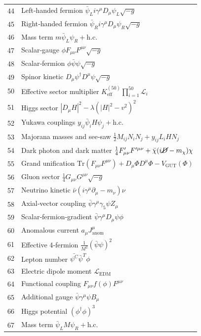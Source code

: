 \documentclass[12pt,a4paper]{article}
\begin{document}
\begin{longtable}{r l}
		44 & Left‑handed fermion \(\bar{\psi}_L i\gamma^\mu D_\mu\psi_L\sqrt{-g}\) \\
		45 & Right‑handed fermion \(\bar{\psi}_R i\gamma^\mu D_\mu\psi_R\sqrt{-g}\) \\
		46 & Mass term \(m\bar{\psi}_L\psi_R + \text{h.c.}\) \\
		47 & Scalar‑gauge \(\phi F_{\mu\nu}F^{\mu\nu}\sqrt{-g}\) \\
		48 & Scalar‑fermion \(\phi\bar{\psi}\psi\sqrt{-g}\) \\
		49 & Spinor kinetic \(D_\mu\psi^\dagger D^\mu\psi\sqrt{-g}\) \\
		50 & Effective sector multiplier \(K^{(50)}_{\mathrm{eff}}\prod_{i=1}^{50}\mathcal{L}_i\) \\
		51 & Higgs sector \(|D_\mu H|^2 - \lambda(|H|^2 - v^2)^2\) \\
		52 & Yukawa couplings \(y_{ij}\bar{\psi}_i H\psi_j + \text{h.c.}\) \\
		53 & Majorana masses and see‑saw \(\frac{1}{2}M_{ij}N_i N_j + y_{ij}L_i H N_j\) \\
		54 & Dark photon and dark matter \(\frac{1}{4}F'_{\mu\nu}F'^{\mu\nu} + \bar{\chi}(i\cancel{D} - m_\chi)\chi\) \\
		55 & Grand unification \(\mathrm{Tr}(F_{\mu\nu}F^{\mu\nu}) + D_\mu\Phi D^\mu\Phi - V_{\text{GUT}}(\Phi)\) \\
		56 & Gluon sector \(\frac{1}{4}G_{\mu\nu}G^{\mu\nu}\sqrt{-g}\) \\
		57 & Neutrino kinetic \(\bar{\nu}(i\gamma^\mu\partial_\mu - m_\nu)\nu\) \\
		58 & Axial‑vector coupling \(\bar{\psi}\gamma^\mu\gamma_5\psi Z_\mu\) \\
		59 & Scalar‑fermion‑gradient \(\bar{\psi}\gamma^\mu D_\mu\psi\phi\) \\
		60 & Anomalous current \(a_\mu J^\mu_{\text{anom}}\) \\
		61 & Effective 4‑fermion \(\frac{1}{M^2}(\bar{\psi}\psi)^2\) \\
		62 & Lepton number \(\bar{\psi^C}\bar{\psi}^T\phi\) \\
		63 & Electric dipole moment \(\mathcal{L}_{\text{EDM}}\) \\
		64 & Functional coupling \(F_{\mu\nu}f(\phi)F^{\mu\nu}\) \\
		65 & Additional gauge \(\bar{\psi}\gamma^\mu\psi B_\mu\) \\
		66 & Higgs potential \((\phi^\dagger\phi)^3\) \\
		67 & Mass term \(\bar{\psi}_L M \psi_R + \text{h.c.}\) \\

\end{longtable}
\end{document}
